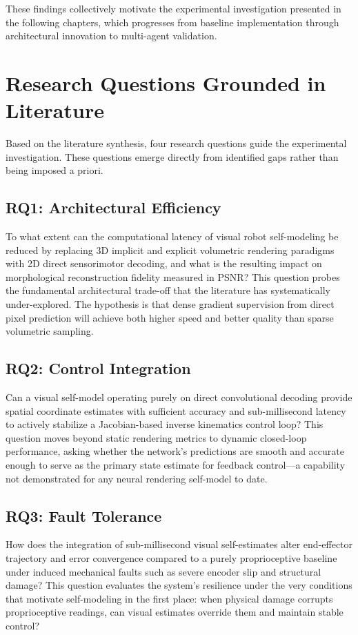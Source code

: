 \documentclass[12pt,a4paper,oneside]{report}
\begin{document}
These findings collectively motivate the experimental investigation presented in the following chapters, which progresses from baseline implementation through architectural innovation to multi-agent validation.

\section{Research Questions Grounded in Literature}
\label{sec:rq_grounded_lit}

Based on the literature synthesis, four research questions guide the experimental investigation. These questions emerge directly from identified gaps rather than being imposed a priori.

\subsection{RQ1: Architectural Efficiency}
To what extent can the computational latency of visual robot self-modeling be reduced by replacing 3D implicit and explicit volumetric rendering paradigms with 2D direct sensorimotor decoding, and what is the resulting impact on morphological reconstruction fidelity measured in PSNR? This question probes the fundamental architectural trade-off that the literature has systematically under-explored. The hypothesis is that dense gradient supervision from direct pixel prediction will achieve both higher speed and better quality than sparse volumetric sampling.

\subsection{RQ2: Control Integration}
Can a visual self-model operating purely on direct convolutional decoding provide spatial coordinate estimates with sufficient accuracy and sub-millisecond latency to actively stabilize a Jacobian-based inverse kinematics control loop? This question moves beyond static rendering metrics to dynamic closed-loop performance, asking whether the network's predictions are smooth and accurate enough to serve as the primary state estimate for feedback control---a capability not demonstrated for any neural rendering self-model to date.

\subsection{RQ3: Fault Tolerance}
How does the integration of sub-millisecond visual self-estimates alter end-effector trajectory and error convergence compared to a purely proprioceptive baseline under induced mechanical faults such as severe encoder slip and structural damage? This question evaluates the system's resilience under the very conditions that motivate self-modeling in the first place: when physical damage corrupts proprioceptive readings, can visual estimates override them and maintain stable control?
\end{document}
